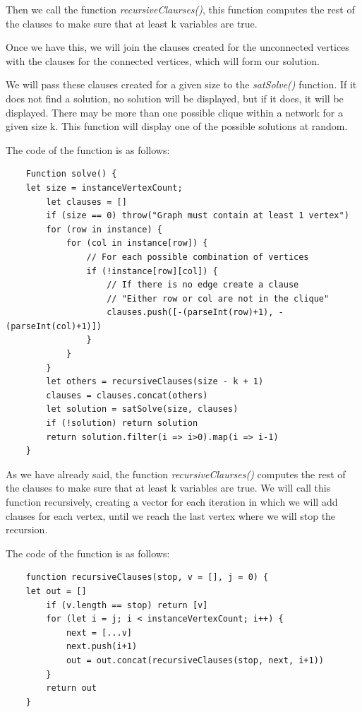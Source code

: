 \documentclass[table]{article}
\begin{document}
\leftskip=0.5in
Then we call the function \textit{recursiveClaurses()}, this function computes the rest of the clauses to make sure that at least k variables are true.

Once we have this, we will join the clauses created for the unconnected vertices with the clauses for the connected vertices, which will form our solution.

We will pass these clauses created for a given size to the \textit{satSolve()} function. If it does not find a solution, no solution will be displayed, but if it does, it will be displayed. There may be more than one possible clique within a network for a given size k. This function will display one of the possible solutions at random.\newline

The code of the function is as follows:

\begin{lstlisting}
    Function solve() {
	let size = instanceVertexCount;
    	let clauses = []
        if (size == 0) throw("Graph must contain at least 1 vertex")
        for (row in instance) {
            for (col in instance[row]) {
                // For each possible combination of vertices
                if (!instance[row][col]) {
                    // If there is no edge create a clause
                    // "Either row or col are not in the clique"
                    clauses.push([-(parseInt(row)+1), -(parseInt(col)+1)])
                }
            }
        }
        let others = recursiveClauses(size - k + 1)
        clauses = clauses.concat(others)
        let solution = satSolve(size, clauses)
        if (!solution) return solution 
        return solution.filter(i => i>0).map(i => i-1)
    }

\end{lstlisting}

As we have already said, the function \textit{recursiveClaurses()} computes the rest of the clauses to make sure that at least k variables are true. 
We will call this function recursively, creating a vector for each iteration in which we will add clauses for each vertex, until we reach the last vertex where we will stop the recursion.

The code of the function is as follows:

\begin{lstlisting}
    function recursiveClauses(stop, v = [], j = 0) {
    let out = []
        if (v.length == stop) return [v]
        for (let i = j; i < instanceVertexCount; i++) {
            next = [...v]
            next.push(i+1)
            out = out.concat(recursiveClauses(stop, next, i+1))
        }
        return out
    }

\end{lstlisting}
\end{document}
